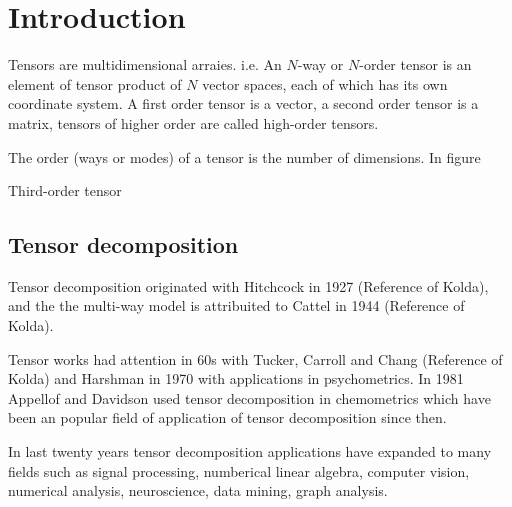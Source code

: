 \documentclass[letterpaper,12pt]{article}
\begin{document}
  



\clearpage


\clearpage

\tableofcontents

\section{Introduction}

Tensors are multidimensional arraies. i.e. An $N$-way or $N$-order tensor is an 
element of tensor product of $N$ vector spaces, each of which has its own 
coordinate system. A first order tensor is a vector, a second order tensor is a 
matrix, tensors of higher order are called high-order tensors.

The order (ways or modes) of a tensor is the number of dimensions. In figure 

Third-order tensor 


\subsection{Tensor decomposition}


Tensor decomposition originated with Hitchcock in 1927 (Reference of Kolda), and 
the the multi-way model is attribuited to Cattel in 1944 (Reference of Kolda).

Tensor works had attention in 60s with Tucker, Carroll and Chang (Reference of 
 Kolda) and Harshman in 1970 with applications in psychometrics. In 1981 
Appellof and Davidson used tensor decomposition in chemometrics which have been 
an popular field of application of tensor decomposition since then.

In last twenty years tensor decomposition applications have expanded to many 
fields such as signal processing, numberical linear algebra, computer vision, 
numerical analysis, neuroscience, data mining, graph analysis.


\end{document}
